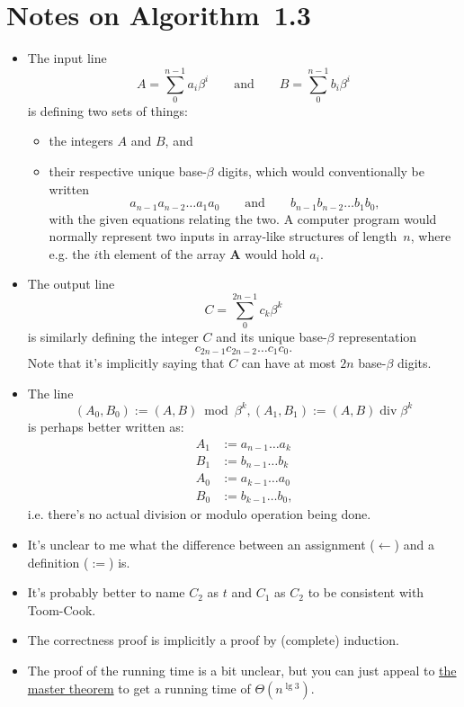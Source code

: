 \documentclass{computer-arithmetic}
\begin{document}
\section{Notes on Algorithm~1.3}

\begin{itemize}
\item The input line
  \[
    A = \sum_0^{n-1} a_i β^i \qquad \text{and} \qquad
    B = \sum_0^{n-1} b_i β^i
  \]
  is defining two sets of things:
  \begin{itemize}
  \item the integers \(A\) and \(B\), and
  \item their respective unique base-\(β\) digits, which would
    conventionally be written
    \[
      a_{n-1} a_{n-2} \dotso a_1 a_0 \qquad \text{and} \qquad
      b_{n-1} b_{n-2} \dotso b_1 b_0\text{,}
    \]
    with the given equations relating the two. A computer program
    would normally represent two inputs in array-like structures of
    length~\(n\), where e.g. the \(i\)th element of the array
    \(\mathbf{A}\) would hold \(a_i\).
  \end{itemize}
\item The output line
  \[
    C = ∑_0^{2n-1} c_k β^k
  \]
  is similarly defining the integer \(C\) and its unique base-\(β\)
  representation
  \[
    c_{2n-1} c_{2n-2} \dotso c_1 c_0\text{.}
  \]
  Note that it's implicitly saying that \(C\) can have at most \(2n\)
  base-\(β\) digits.
\item The line
  \[
    (A_0, B_0) := (A, B) \bmod β^k, (A_1, B_1) := (A, B) \operatorname{div} β^k
  \]
  is perhaps better written as:
  \begin{align*}
    A_1 &:= a_{n-1} \dotso a_k \\
    B_1 &:= b_{n-1} \dotso b_k \\
    A_0 &:= a_{k-1} \dotso a_0 \\
    B_0 &:= b_{k-1} \dotso b_0\text{,}
  \end{align*}
  i.e. there's no actual division or modulo operation being done.
\item It's unclear to me what the difference between an assignment (\(←\))
  and a definition (\(:=\)) is.
\item It's probably better to name \(C_2\) as \(t\) and \(C_1\) as
  \(C_2\) to be consistent with Toom-Cook.
\item The correctness proof is implicitly a proof by (complete) induction.
\item The proof of the running time is a bit unclear, but you can just
  appeal to
  \href{https://en.wikipedia.org/wiki/Master_theorem_(analysis_of_algorithms)#Generic_form}{the
    master theorem} to get a running time of \(Θ(n^{\lg 3})\).
\end{itemize}
\end{document}
